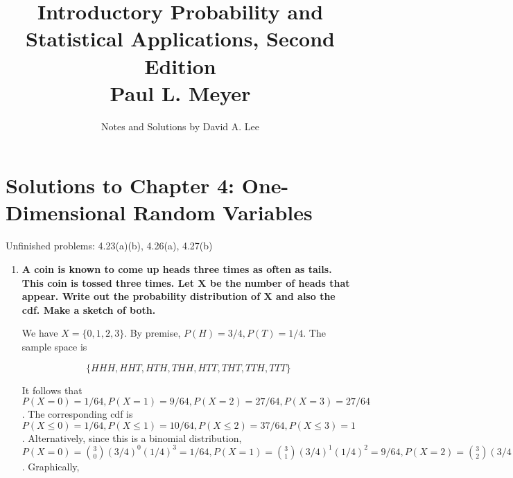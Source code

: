 \documentclass[10pt, oneside]{article}   	%
\title{Introductory Probability and Statistical Applications, Second Edition \\
\large{Paul L. Meyer}}
\author{Notes and Solutions by David A. Lee}
\date{}							%
\theoremstyle{definition}
\begin{document}
\maketitle
\section*{Solutions to Chapter 4: One-Dimensional Random Variables}

Unfinished problems: 4.23(a)(b), 4.26(a), 4.27(b)

\begin{enumerate}[label=4.\arabic*]
\itemsep0em 
\item  \begin{tcolorbox}[
  colback=Cerulean!5!white,
  colframe=Cerulean!75!black]
\textbf{A coin is known to come up heads three times as often as tails. This coin is tossed three times. Let $\bm{X}$ be the number of heads that appear. Write out the probability distribution of $\bm{X}$ and also the cdf. Make a sketch of both.}
\end{tcolorbox}

We have $X = \{0, 1, 2, 3 \}$. By premise, $P(H) = 3/4, P(T) = 1/4$. The sample space is 

\[ \{ HHH, HHT, HTH, THH, HTT, THT, TTH, TTT \} \] 

It follows that $P(X = 0) = 1/64, P(X = 1) = 9/64, P(X = 2) = 27/64, P(X = 3) = 27/64$. The corresponding cdf is $P(X \leq 0) = 1/64, P(X \leq 1) = 10/64, P(X \leq 2) = 37/64, P(X \leq 3) = 1$. Alternatively, since this is a binomial distribution, $P(X = 0) = \binom{3}{0}(3/4)^0 (1/4)^3 = 1/64, P(X = 1) = \binom{3}{1}(3/4)^1 (1/4)^2 = 9/64, P(X = 2) = \binom{3}{2}(3/4)^2 (1/4)^1 = 27/64, P(X = 3) = \binom{3}{3}(3/4)^3 (1/4)^0 = 27/64$. Graphically,


\end{enumerate}
\end{document}

